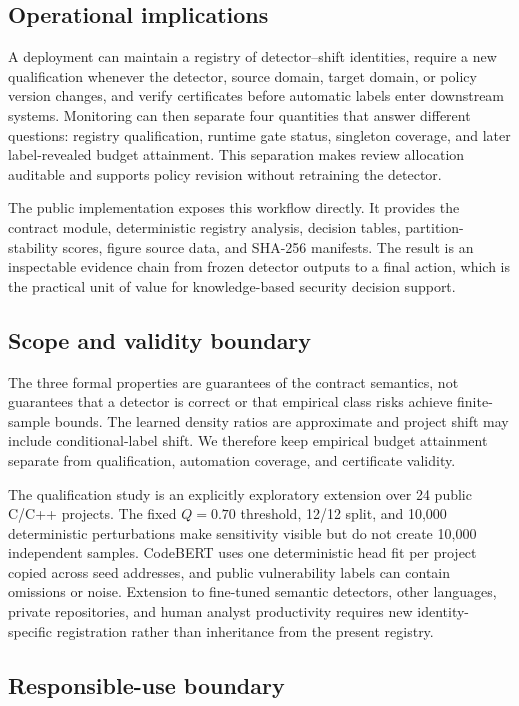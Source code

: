 \documentclass[preprint,12pt]{elsarticle}
\begin{document}
\subsection{Operational implications}

A deployment can maintain a registry of detector--shift identities, require a new qualification whenever the detector, source domain, target domain, or policy version changes, and verify certificates before automatic labels enter downstream systems. Monitoring can then separate four quantities that answer different questions: registry qualification, runtime gate status, singleton coverage, and later label-revealed budget attainment. This separation makes review allocation auditable and supports policy revision without retraining the detector.

The public implementation exposes this workflow directly. It provides the contract module, deterministic registry analysis, decision tables, partition-stability scores, figure source data, and SHA-256 manifests. The result is an inspectable evidence chain from frozen detector outputs to a final action, which is the practical unit of value for knowledge-based security decision support.

\subsection{Scope and validity boundary}

The three formal properties are guarantees of the contract semantics, not guarantees that a detector is correct or that empirical class risks achieve finite-sample bounds. The learned density ratios are approximate and project shift may include conditional-label shift. We therefore keep empirical budget attainment separate from qualification, automation coverage, and certificate validity.

The qualification study is an explicitly exploratory extension over 24 public C/C++ projects. The fixed $Q=0.70$ threshold, 12/12 split, and 10,000 deterministic perturbations make sensitivity visible but do not create 10,000 independent samples. CodeBERT uses one deterministic head fit per project copied across seed addresses, and public vulnerability labels can contain omissions or noise. Extension to fine-tuned semantic detectors, other languages, private repositories, and human analyst productivity requires new identity-specific registration rather than inheritance from the present registry.

\subsection{Responsible-use boundary}
\end{document}

